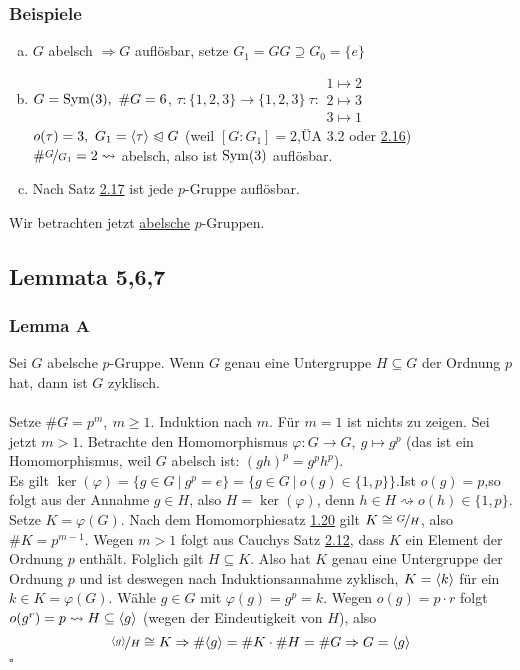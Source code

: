 \subsubsection*{Beispiele}
\begin{enumerate}[(a)]
	\item $G$ abelsch $\Rightarrow G$ auflösbar, setze $G_1=GG\supseteq G_0=\{e\}$
	\item $G=\operatorname{Sym}(3),~\#G=6$, $\tau:\{1,2,3\}\to \{1,2,3\}~\tau:\begin{array}{c} 1\mapsto 2\\ 2\mapsto 3\\ 3\mapsto 1    \end{array}$\\
	$o(\tau)=3,~G_1=\langle \tau \rangle\trianglelefteqslant G$ (weil $[G:G_1]=2$,ÜA 3.2 oder \hyperref[sub:satz_8]{2.16})\\
	$\#\nicefrac{G}{G_1}=2\rightsquigarrow$ abelsch, also ist $\operatorname{Sym}(3)$ auflösbar.
	\item Nach Satz \hyperref[sub:lemma_4]{2.17} ist jede $p$-Gruppe auflösbar.
\end{enumerate}

Wir betrachten jetzt \uline{abelsche} $p$-Gruppen.

\subsection{Lemmata 5,6,7}
\label{sub:lemmata}
\subsubsection*{Lemma A}
Sei $G$ abelsche $p$-Gruppe. Wenn $G$ genau eine Untergruppe $H\subseteq G$ der Ordnung $p$ hat, dann ist $G$ zyklisch.\\

\\
Setze $\#G=p^m,~m\ge 1$. Induktion nach $m$. Für $m=1$ ist nichts zu zeigen. Sei jetzt $m>1$. Betrachte den Homomorphismus $\varphi: G\to G,~g\mapsto g^p$ (das ist ein Homomorphismus, weil $G$ abelsch ist: $(gh)^p=g^ph^p$).\\
Es gilt $\ker(\varphi)=\big\{g\in G~|~g^p=e \big\}=\big\{g\in G~|~o(g)\in \{1,p\} \big\}$.Ist $o(g)=p$,so folgt aus der Annahme $g\in H$, also $H=\ker(\varphi)$, denn $h\in H\rightsquigarrow o(h)\in \{1,p\}$.\\
Setze $K=\varphi(G)$. Nach dem Homomorphiesatz \hyperref[sub:der_homomorphiesatz]{1.20} gilt $K\cong \nicefrac{G}{H}$, also $\#K=p^{m-1}$. Wegen $m>1$ folgt aus Cauchys Satz \hyperref[sub:cauchys_satz]{2.12}, dass $K$ ein Element der Ordnung $p$ enthält. Folglich gilt $H\subseteq K$. Also hat $K$ genau eine Untergruppe der Ordnung $p$ und ist deswegen nach Induktionsannahme zyklisch, $K=\langle k \rangle$ für ein $k\in K=\varphi(G)$. Wähle $g\in G$ mit $\varphi(g)=g^p=k$. Wegen $o(g)=p\cdot r$ folgt $o(g^r)=p\rightsquigarrow H\subseteq \langle g \rangle$ (wegen der Eindeutigkeit von $H$), also \[\nicefrac{\langle g \rangle}{H}\cong K\Rightarrow\#\langle g \rangle=\#K\cdot\#H=\#G\Rightarrow G=\langle g \rangle\]
\hfill $\square$

